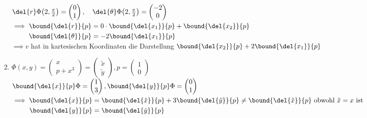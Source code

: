 \begin{exmp}
\begin{enumerate}[label={\roman*})]
\begin{minipage}{\linewidth}
				$ \del{r} \Phi \big(2,\frac{\pi}{2} \big) = \begin{pmatrix}
					0\\1
				\end{pmatrix}, \quad \del{\theta} \Phi \big( 2,\frac{\pi}{2} \big) = \begin{pmatrix}
					-2\\0
				\end{pmatrix} $\\
				$ \implies \begin{aligned}[t]
					\bound{\del{r}}{p} &= 0 \cdot \bound{\del{x_1}}{p} + \bound{\del{x_2}}{p}\\
					\bound{\del{\theta}}{p} &= -2 \bound{\del{x_1}}{p}
				\end{aligned} $\\
				$ \implies v $ hat in kartesischen Koordinaten die Darstellung $ \bound{\del{x_2}}{p} + 2 \bound{\del{x_1}}{p} $
			\end{minipage}
		\item $ \Phi(x,y) = \begin{pmatrix}
			x\\p+x^3
			\end{pmatrix} = \begin{pmatrix}
				\tilde{x}\\\tilde{y}
			\end{pmatrix}, p = \begin{pmatrix}
				1\\0
			\end{pmatrix} $\\
			$ \bound{\del{x}}{p}\Phi = \begin{pmatrix}
				1\\3
			\end{pmatrix}, \bound{\del{y}}{p}\Phi = \begin{pmatrix}
				0\\1
			\end{pmatrix} $\\
			$ \implies \begin{aligned}[t]
				\bound{\del{x}}{p} &= \bound{\del{\tilde{x}}}{p} + 3\bound{\del{\tilde{y}}}{p} \neq \bound{\del{\tilde{x}}}{p} \ \text{obwohl } \tilde{x} = x\ \text{ist}\\
				\bound{\del{y}}{p} &= \bound{\del{\tilde{y}}}{p}
			\end{aligned}$
	\end{enumerate}
\end{exmp}

